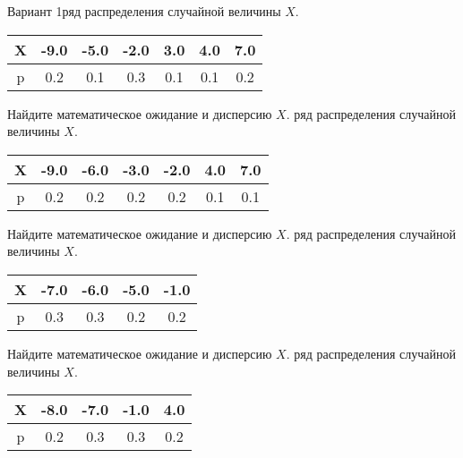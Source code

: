 \documentclass[a4paper,12pt]{article}
\begin{document}
Вариант 1\medskip{} ряд распределения случайной величины $X$. 
    \begin{center} 
    \begin{tabular}{|c|c|c|c|c|c|c|}


\hline
X & -9.0 & -5.0 & -2.0 &  3.0 &  4.0 &  7.0 \\ \hline
p &  0.2 &  0.1 &  0.3 &  0.1 &  0.1 &  0.2 \\ \hline

\end{tabular}

    \end{center}
    Найдите математическое ожидание и дисперсию $X$.
    \bigskip{}\medskip{} ряд распределения случайной величины $X$. 
    \begin{center} 
    \begin{tabular}{|c|c|c|c|c|c|c|}


\hline
X & -9.0 & -6.0 & -3.0 & -2.0 &  4.0 &  7.0 \\ \hline
p &  0.2 &  0.2 &  0.2 &  0.2 &  0.1 &  0.1 \\ \hline

\end{tabular}

    \end{center}
    Найдите математическое ожидание и дисперсию $X$.
    \bigskip{}\medskip{} ряд распределения случайной величины $X$. 
    \begin{center} 
    \begin{tabular}{|c|c|c|c|c|}


\hline
X & -7.0 & -6.0 & -5.0 & -1.0 \\ \hline
p &  0.3 &  0.3 &  0.2 &  0.2 \\ \hline

\end{tabular}

    \end{center}
    Найдите математическое ожидание и дисперсию $X$.
    \bigskip{}\medskip{} ряд распределения случайной величины $X$. 
    \begin{center} 
    \begin{tabular}{|c|c|c|c|c|}


\hline
X & -8.0 & -7.0 & -1.0 &  4.0 \\ \hline
p &  0.2 &  0.3 &  0.3 &  0.2 \\ \hline

\end{tabular}

    \end{center}
\end{document}
